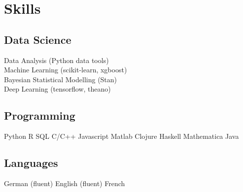 \documentclass[]{deedy-resume-openfont}
\begin{document}
\begin{minipage}[t]{0.33\textwidth}



\sectionsep
\section{Skills}

\sectionsep
\subsection{Data Science}
\textbullet{} Data Analysis (Python data tools) \\
\textbullet{} Machine Learning (scikit-learn, xgboost) \\
\textbullet{} Bayesian Statistical Modelling (Stan)\\
\textbullet{} Deep Learning (tensorflow, theano)

\sectionsep
\subsection{Programming}
    Python \textbullet{}
    R \textbullet{}
    SQL \textbullet{}
    C/C++ \textbullet{}
    Javascript \textbullet{}
    Matlab \textbullet{}
    Clojure \textbullet{}
    Haskell \textbullet{}
    Mathematica \textbullet{}
    Java
   
\sectionsep
\subsection{Languages}
German (fluent) \textbullet{}
English (fluent) \textbullet{}
French



%
%

\end{minipage} 
\hfill
\end{document}
